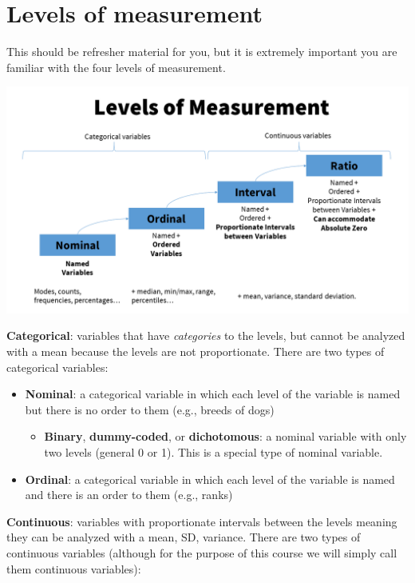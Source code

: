 \documentclass[
]{book}
\providecommand{\tightlist}{%
  \setlength{\itemsep}{0pt}\setlength{\parskip}{0pt}}
\begin{document}
\hypertarget{levels-of-measurement}{%
\section{Levels of measurement}\label{levels-of-measurement}}

This should be refresher material for you, but it is extremely important you are familiar with the four levels of measurement.

\includegraphics{images/01-intro/Levels of measurement.png}

\textbf{Categorical}: variables that have \emph{categories} to the levels, but cannot be analyzed with a mean because the levels are not proportionate. There are two types of categorical variables:

\begin{itemize}
\item
  \textbf{Nominal}: a categorical variable in which each level of the variable is named but there is no order to them (e.g., breeds of dogs)

  \begin{itemize}
  \tightlist
  \item
    \textbf{Binary}, \textbf{dummy-coded}, or \textbf{dichotomous}: a nominal variable with only two levels (general 0 or 1). This is a special type of nominal variable.
  \end{itemize}
\item
  \textbf{Ordinal}: a categorical variable in which each level of the variable is named and there is an order to them (e.g., ranks)
\end{itemize}

\textbf{Continuous}: variables with proportionate intervals between the levels meaning they can be analyzed with a mean, SD, variance. There are two types of continuous variables (although for the purpose of this course we will simply call them continuous variables):
\end{document}
